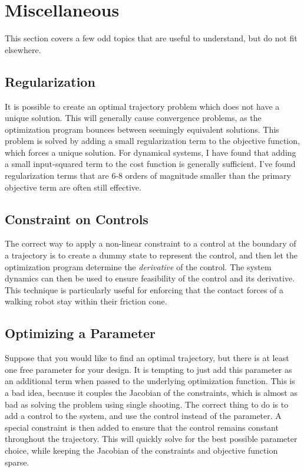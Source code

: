 \section{Miscellaneous}

This section covers a few odd topics that are useful to understand, but do not fit elsewhere.

\subsection{Regularization}
It is possible to create an optimal trajectory problem which does not have a unique solution. This will generally cause convergence problems, as the optimization program bounces between seemingly equivalent solutions. This problem is solved by adding a small regularization term to the objective function, which forces a unique solution. For dynamical systems, I have found that adding a small input-squared term to the cost function is generally sufficient. I've found regularization terms that are 6-8 orders of magnitude smaller than the primary objective term are often still effective.

\subsection{Constraint on Controls}
The correct way to apply a non-linear constraint to a control at the boundary of a trajectory is to create a dummy state to represent the control, and then let the optimization program determine the {\em derivative} of the control. The system dynamics can then be used to ensure feasibility of the control and its derivative. This technique is particularly useful for enforcing that the contact forces of a walking robot stay within their friction cone.

\subsection{Optimizing a Parameter}
Suppose that you would like to find an optimal trajectory, but there is at least one free parameter for your design. It is tempting to just add this parameter as an additional term when passed to the underlying optimization function. This is a bad idea, because it couples the Jacobian of the constraints, which is almost as bad as solving the problem using single shooting. The correct thing to do is to add a control to the system, and use the control instead of the parameter. A special constraint is then added to ensure that the control remains constant throughout the trajectory. This will quickly solve for the best possible parameter choice, while keeping the Jacobian of the constraints and objective function sparse.